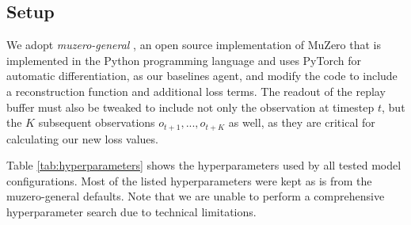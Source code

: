 \subsection{Setup}
We adopt \textit{muzero-general} \cite{muzero-general}, an open source implementation of MuZero that is implemented in the Python programming language and uses PyTorch for automatic differentiation, as our baselines agent, and modify the code to include a reconstruction function and additional loss terms. The readout of the replay buffer must also be tweaked to include not only the observation at timestep $t$, but the $K$ subsequent observations $o_{t+1}, ..., o_{t+K}$ as well, as they are critical for calculating our new loss values.

Table \ref{tab:hyperparameters} shows the hyperparameters used by all tested model configurations. Most of the listed hyperparameters were kept as is from the muzero-general defaults. Note that we are unable to perform a comprehensive hyperparameter search due to technical limitations.
